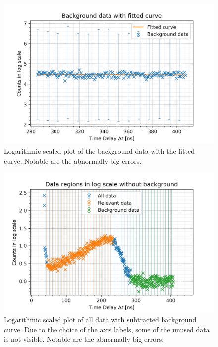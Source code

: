 \documentclass[30pt,a4paper]{article}
\begin{document}
  	\begin{figure}[h]
 	\includegraphics{Bilder/log_bkg}
 	\centering
 	\caption[Logarithmic scaled Background]{\small Logarithmic scaled plot of the background data with the fitted
 	curve. Notable are the abnormally big errors.}
 	\label{log_bkg}
	\end{figure}

 	\begin{figure}[h]
 	\includegraphics{Bilder/log_clean}
 	\centering
 	\caption[Data without Background]{\small Logarithmic scaled plot of all data with subtracted background curve. Due to the choice of the axis labels, some of the unused data is not visible. Notable are the abnormally big errors.}
 	\label{log_clean}
	\end{figure}
\end{document}
